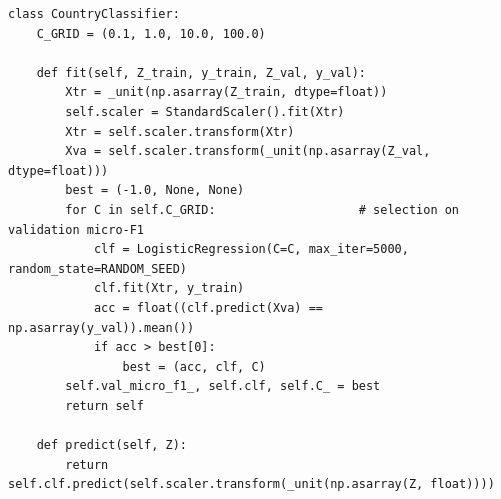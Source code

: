 \begin{lstlisting}[caption={TODO 3b --- \texttt{CountryClassifier}},captionpos=b]
class CountryClassifier:
    C_GRID = (0.1, 1.0, 10.0, 100.0)

    def fit(self, Z_train, y_train, Z_val, y_val):
        Xtr = _unit(np.asarray(Z_train, dtype=float))
        self.scaler = StandardScaler().fit(Xtr)
        Xtr = self.scaler.transform(Xtr)
        Xva = self.scaler.transform(_unit(np.asarray(Z_val, dtype=float)))
        best = (-1.0, None, None)
        for C in self.C_GRID:                    # selection on validation micro-F1
            clf = LogisticRegression(C=C, max_iter=5000, random_state=RANDOM_SEED)
            clf.fit(Xtr, y_train)
            acc = float((clf.predict(Xva) == np.asarray(y_val)).mean())
            if acc > best[0]:
                best = (acc, clf, C)
        self.val_micro_f1_, self.clf, self.C_ = best
        return self

    def predict(self, Z):
        return self.clf.predict(self.scaler.transform(_unit(np.asarray(Z, float))))
\end{lstlisting}


